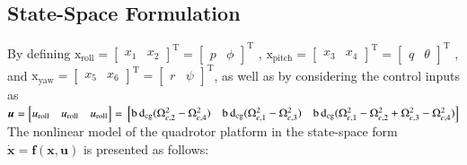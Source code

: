 \documentclass[3p]{elsarticle}
\begin{document}
\subsection{State-Space Formulation}\label{sec:state-space}
\noindent By defining $\boldsymbol{\mathrm{x}}_{\text{roll}} = \begin{bmatrix}
    x_1 & x_2
\end{bmatrix}^{\mathrm{T}}=
\begin{bmatrix}
    p & \phi
\end{bmatrix}^{\mathrm{T}}$
,
$\boldsymbol{\mathrm{x}}_{\text{pitch}} = \begin{bmatrix}
    x_3 & x_4 \end{bmatrix}^{\mathrm{T}} = 
    \begin{bmatrix}
    q & \theta \end{bmatrix}^{\mathrm{T}}
    $
    , and
    $\boldsymbol{\mathrm{x}}_{\text{yaw}} = 
    \begin{bmatrix}
        x_5 & x_6
    \end{bmatrix}^{\mathrm{T}} = 
    \begin{bmatrix}
        r & \psi
    \end{bmatrix}^{\mathrm{T}}$, as well as by considering the control inputs as 
    $\boldsymbol{u} = \begin{bmatrix}
        u_{\text{roll}} & u_{\text{roll}} & u_{\text{roll}}
    \end{bmatrix} = \\ \begin{bmatrix}
        \mathrm{b\,d}_{\text{cg}}(\Omega_{c, 2}^2 - \Omega_{c, 4}^2) & \mathrm{b\,d}_{\text{cg}}(\Omega_{c, 1}^2 - \Omega_{c, 3}^2) &
        \mathrm{b\,d}_{\text{cg}}(\Omega_{c, 1}^2 - \Omega_{c, 2}^2+ \Omega_{c, 3}^2 - \Omega_{c, 4}^2)
    \end{bmatrix}$
    The nonlinear model of the quadrotor platform in the state-space form $\dot{\boldsymbol{x}} = \boldsymbol{f}(\boldsymbol{x}, \boldsymbol{u})$ is presented as follows:
\end{document}
